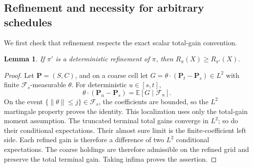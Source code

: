 \documentclass[11pt,a4paper]{amsart}
\theoremstyle{plain}
\newtheorem{lemma}[theorem]{Lemma}
\theoremstyle{definition}
\theoremstyle{remark}
\newcommand{\EE}{\mathbb{E}}
\newcommand{\F}{\mathcal F}
\begin{document}
\subsection{Refinement and necessity for arbitrary schedules}
We first check that refinement respects the exact scalar total-gain convention.
\begin{lemma}\label{lem:refinement}
If $\pi'$ is a deterministic refinement of $\pi$, then $R_\pi(X)\ge R_{\pi'}(X)$.
\end{lemma}
\begin{proof}
Let $\mathbf P=(S,C)$, and on a coarse cell let $G=\theta\cdot(\mathbf P_t-\mathbf P_s)\in L^2$ with finite $\F_s$-measurable $\theta$. For deterministic $u\in[s,t]$,
\begin{equation}\label{eq:partial-gain}
 \theta\cdot(\mathbf P_u-\mathbf P_s)=\EE[G\mid\F_u].
\end{equation}
On the event $\{\|\theta\|\le j\}\in\F_s$, the coefficients are bounded, so the $L^2$ martingale property proves the identity. This localization uses only the total-gain moment assumption. The truncated terminal total gains converge in $L^2$; so do their conditional expectations. Their almost sure limit is the finite-coefficient left side. Each refined gain is therefore a difference of two $L^2$ conditional expectations. The coarse holdings are therefore admissible on the refined grid and preserve the total terminal gain. Taking infima proves the assertion.
\end{proof}
\end{document}
